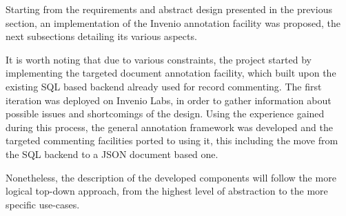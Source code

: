 
Starting from the requirements and abstract design presented in the previous
section, an implementation of the Invenio annotation facility was proposed,
the next subsections detailing its various aspects.

It is worth noting that due to various constraints, the project started by
implementing the targeted document annotation facility, which built upon the
existing SQL based backend already used for record commenting. The first
iteration was deployed on Invenio Labs, in order to gather information about
possible issues and shortcomings of the design. Using the experience gained
during this process, the general annotation framework was developed and the
targeted commenting facilities ported to using it, this including the  move
from the SQL backend to a JSON document based one.

Nonetheless, the description of the developed components will follow the more
logical top-down approach, from the highest level of abstraction to the more
specific use-cases.
